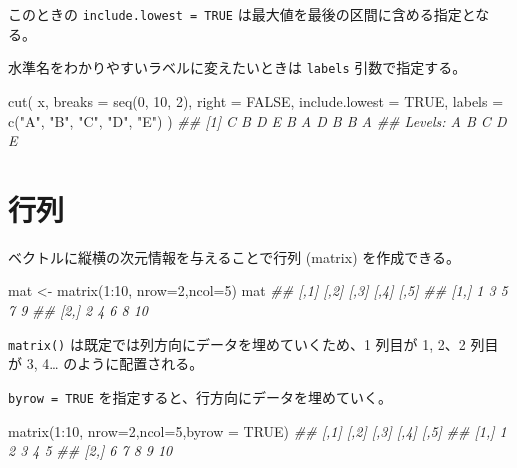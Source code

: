 \documentclass[
  letterpaper,
  xelatex,
  ja=standard, xelatex]{bxjsbook}
\newenvironment{Shaded}{\begin{snugshade}}{\end{snugshade}}
\newcommand{\AttributeTok}[1]{\textcolor[rgb]{0.40,0.45,0.13}{#1}}
\newcommand{\ConstantTok}[1]{\textcolor[rgb]{0.56,0.35,0.01}{#1}}
\newcommand{\DecValTok}[1]{\textcolor[rgb]{0.68,0.00,0.00}{#1}}
\newcommand{\DocumentationTok}[1]{\textcolor[rgb]{0.37,0.37,0.37}{\textit{#1}}}
\newcommand{\FunctionTok}[1]{\textcolor[rgb]{0.28,0.35,0.67}{#1}}
\newcommand{\NormalTok}[1]{\textcolor[rgb]{0.00,0.23,0.31}{#1}}
\newcommand{\OtherTok}[1]{\textcolor[rgb]{0.00,0.23,0.31}{#1}}
\newcommand{\SpecialCharTok}[1]{\textcolor[rgb]{0.37,0.37,0.37}{#1}}
\newcommand{\StringTok}[1]{\textcolor[rgb]{0.13,0.47,0.30}{#1}}
\begin{document}
このときの \texttt{include.lowest\ =\ TRUE}
は最大値を最後の区間に含める指定となる。

水準名をわかりやすいラベルに変えたいときは \texttt{labels}
引数で指定する。

\begin{Shaded}
\begin{Highlighting}[]
\FunctionTok{cut}\NormalTok{(}
\NormalTok{  x,}
  \AttributeTok{breaks =} \FunctionTok{seq}\NormalTok{(}\DecValTok{0}\NormalTok{, }\DecValTok{10}\NormalTok{, }\DecValTok{2}\NormalTok{),}
  \AttributeTok{right =} \ConstantTok{FALSE}\NormalTok{,}
  \AttributeTok{include.lowest =} \ConstantTok{TRUE}\NormalTok{,}
  \AttributeTok{labels =} \FunctionTok{c}\NormalTok{(}\StringTok{"A"}\NormalTok{, }\StringTok{"B"}\NormalTok{, }\StringTok{"C"}\NormalTok{, }\StringTok{"D"}\NormalTok{, }\StringTok{"E"}\NormalTok{)}
\NormalTok{)}
\DocumentationTok{\#\#  [1] C B D E B A D B B A}
\DocumentationTok{\#\# Levels: A B C D E}
\end{Highlighting}
\end{Shaded}

\section{行列}\label{ux884cux5217}

ベクトルに縦横の次元情報を与えることで行列 (matrix) を作成できる。

\begin{Shaded}
\begin{Highlighting}[]
\NormalTok{mat }\OtherTok{\textless{}{-}} \FunctionTok{matrix}\NormalTok{(}\DecValTok{1}\SpecialCharTok{:}\DecValTok{10}\NormalTok{, }\AttributeTok{nrow=}\DecValTok{2}\NormalTok{,}\AttributeTok{ncol=}\DecValTok{5}\NormalTok{)}
\NormalTok{mat}
\DocumentationTok{\#\#      [,1] [,2] [,3] [,4] [,5]}
\DocumentationTok{\#\# [1,]    1    3    5    7    9}
\DocumentationTok{\#\# [2,]    2    4    6    8   10}
\end{Highlighting}
\end{Shaded}

\texttt{matrix()} は既定では列方向にデータを埋めていくため、1 列目が 1,
2、2 列目が 3, 4\ldots{} のように配置される。

\texttt{byrow\ =\ TRUE} を指定すると、行方向にデータを埋めていく。

\begin{Shaded}
\begin{Highlighting}[]
\FunctionTok{matrix}\NormalTok{(}\DecValTok{1}\SpecialCharTok{:}\DecValTok{10}\NormalTok{, }\AttributeTok{nrow=}\DecValTok{2}\NormalTok{,}\AttributeTok{ncol=}\DecValTok{5}\NormalTok{,}\AttributeTok{byrow =} \ConstantTok{TRUE}\NormalTok{)}
\DocumentationTok{\#\#      [,1] [,2] [,3] [,4] [,5]}
\DocumentationTok{\#\# [1,]    1    2    3    4    5}
\DocumentationTok{\#\# [2,]    6    7    8    9   10}
\end{Highlighting}
\end{Shaded}
\end{document}
